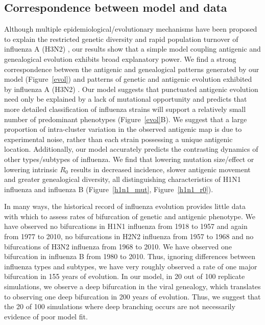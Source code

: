 \documentclass[11pt,oneside,letterpaper]{article}
\begin{document}
\subsection*{Correspondence between model and data}

Although multiple epidemiological/evolutionary mechanisms have been proposed to explain the restricted genetic diversity and rapid population turnover of influenza A (H3N2) \cite{Ferguson03,Tria05,Koelle06,Recker07}, our results show that a simple model coupling antigenic and genealogical evolution exhibits broad explanatory power.  We find a strong correspondence between the antigenic and genealogical patterns generated by our model (Figure~\ref{evol}) and patterns of genetic and antigenic evolution exhibited by influenza A (H3N2) \cite{Fitch97,Smith04}.  Our model suggests that punctuated antigenic evolution need only be explained by a lack of mutational opportunity and predicts that more detailed classification of influenza strains will support a relatively small number of predominant phenotypes (Figure~\ref{evol}B).  We suggest that a large proportion of intra-cluster variation in the observed antigenic map is due to experimental noise, rather than each strain possessing a unique antigenic location.  Additionally, our model accurately predicts the contrasting dynamics of other types/subtypes of influenza.  We find that lowering mutation size/effect or lowering intrinsic $R_0$ results in decreased incidence, slower antigenic movement and greater genealogical diversity, all distinguishing characteristics of H1N1 influenza and influenza B (Figure~\ref{h1n1_mut}, Figure~\ref{h1n1_r0}).  

In many ways, the historical record of influenza evolution provides little data with which to assess rates of bifurcation of genetic and antigenic phenotype.  We have observed no bifurcations in H1N1 influenza from 1918 to 1957 and again from 1977 to 2010, no bifurcations in H2N2 influenza from 1957 to 1968 and no bifurcations of H3N2 influenza from 1968 to 2010.  We have observed one bifurcation in influenza B from 1980 to 2010.  Thus, ignoring differences between influenza types and subtypes, we have very roughly observed a rate of one major bifurcation in 155 years of evolution.  In our model, in 20 out of 100 replicate simulations, we observe a deep bifurcation in the viral genealogy, which translates to observing one deep bifurcation in 200 years of evolution.  Thus, we suggest that the 20 of 100 simulations where deep branching occurs are not necessarily evidence of poor model fit.
\end{document}
